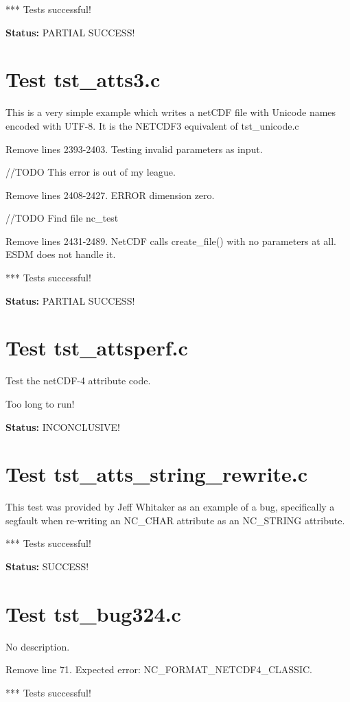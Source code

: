 *** Tests successful!

{\bf \large Status: } PARTIAL SUCCESS!

\section{Test tst\_atts3.c}

This is a very simple example which writes a netCDF file with
Unicode names encoded with UTF-8. It is the NETCDF3 equivalent
of tst\_unicode.c

Remove lines 2393-2403. Testing invalid parameters as input.

//TODO This error is out of my league.

Remove lines 2408-2427. ERROR dimension zero.

//TODO Find file nc\_test

Remove lines 2431-2489. NetCDF calls create\_file() with no parameters at all. ESDM does not handle it.

*** Tests successful!

{\bf \large Status: } PARTIAL SUCCESS!

\section{Test tst\_attsperf.c}

Test the netCDF-4 attribute code.

Too long to run!

{\bf \large Status: } INCONCLUSIVE!

\section{Test tst\_atts\_string\_rewrite.c}

This test was provided by Jeff Whitaker as an example of a bug,
specifically a segfault when re-writing an NC\_CHAR attribute as
an NC\_STRING attribute.

*** Tests successful!

{\bf \large Status: } SUCCESS!

\section{Test tst\_bug324.c}

No description.

Remove line 71. Expected error: NC\_FORMAT\_NETCDF4\_CLASSIC.

*** Tests successful!

